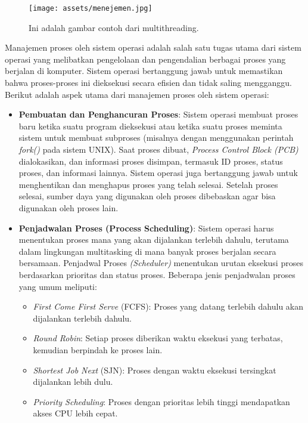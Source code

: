 \documentclass[12pt]{article}
\begin{document}
\begin{figure}[h]
    \centering
    \texttt{[image: assets/menejemen.jpg]}  %
    \caption{Ini adalah gambar contoh dari multithreading.}
    \label{fig:contoh_gambar}
\end{figure}
Manajemen proses oleh sistem operasi adalah salah satu tugas utama dari sistem operasi yang melibatkan pengelolaan dan pengendalian berbagai proses yang berjalan di komputer. Sistem operasi bertanggung jawab untuk memastikan bahwa proses-proses ini dieksekusi secara efisien dan tidak saling mengganggu. Berikut adalah aspek utama dari manajemen proses oleh sistem operasi:

\begin{itemize}
    \item \textbf{Pembuatan dan Penghancuran Proses}: 
   Sistem operasi membuat proses baru ketika suatu program dieksekusi atau ketika suatu proses meminta sistem untuk membuat subproses (misalnya dengan menggunakan perintah \textit{fork()} pada sistem UNIX). Saat proses dibuat, \textit{Process Control Block (PCB)} dialokasikan, dan informasi proses disimpan, termasuk ID proses, status proses, dan informasi lainnya. Sistem operasi juga bertanggung jawab untuk menghentikan dan menghapus proses yang telah selesai. Setelah proses selesai, sumber daya yang digunakan oleh proses dibebaskan agar bisa digunakan oleh proses lain.
    
    \item \textbf{Penjadwalan Proses (Process Scheduling)}: 
    Sistem operasi harus menentukan proses mana yang akan dijalankan terlebih dahulu, terutama dalam lingkungan multitasking di mana banyak proses berjalan secara bersamaan. Penjadwal Proses\textit{ (Scheduler) }menentukan urutan eksekusi proses berdasarkan prioritas dan status proses. Beberapa jenis penjadwalan proses yang umum meliputi:
    \begin{itemize}
        \item \textit{First Come First Serve }(FCFS): Proses yang datang terlebih dahulu akan dijalankan terlebih dahulu.
        \item \textit{Round Robin}: Setiap proses diberikan waktu eksekusi yang terbatas, kemudian berpindah ke proses lain.
        \item \textit{Shortest Job Next} (SJN): Proses dengan waktu eksekusi tersingkat dijalankan lebih dulu.
        \item \textit{Priority Scheduling}: Proses dengan prioritas lebih tinggi mendapatkan akses CPU lebih cepat.
    \end{itemize}
    

\end{itemize}
\end{document}
